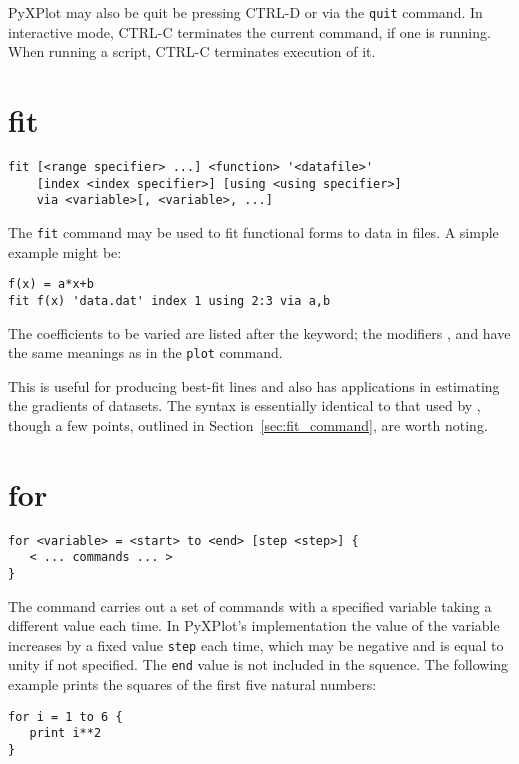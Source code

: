 PyXPlot may also be quit be pressing CTRL-D or via the {\tt quit} command. In
interactive mode, CTRL-C terminates the current command, if one is running.
When running a script, CTRL-C terminates execution of it.


\section{fit}

\begin{verbatim}
fit [<range specifier> ...] <function> '<datafile>'
    [index <index specifier>] [using <using specifier>]
    via <variable>[, <variable>, ...]
\end{verbatim}

The {\tt fit} command may be used to fit functional forms to data in
files. A simple example might be:

\begin{verbatim}
f(x) = a*x+b
fit f(x) 'data.dat' index 1 using 2:3 via a,b
\end{verbatim}

\noindent The coefficients to be varied are listed after the 
 keyword; the modifiers ,  and
 have the same meanings as in the {\tt plot} command.

This is useful for producing best-fit lines and also has applications in
estimating the gradients of datasets.  The syntax is essentially identical to
that used by \gnuplot, though a few points, outlined in
Section~\ref{sec:fit_command}, are worth noting.

\section{for}

\begin{verbatim}
for <variable> = <start> to <end> [step <step>] {
   < ... commands ... >
}
\end{verbatim}

The  command carries out a set of commands with a specified
variable taking a different value each time.  In PyXPlot's implementation the
value of the variable increases by a fixed value {\tt step} each time, which may
be negative and is equal to unity if not specified.  The {\tt end} value is not
included in the squence.  The following example prints the squares of the first
five natural numbers:

\begin{verbatim}
for i = 1 to 6 {
   print i**2
}
\end{verbatim}

